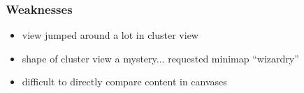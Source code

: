 \documentclass[12pt,fleqn]{ucithesis}
\begin{document}
\subsubsection{Weaknesses}

\begin{itemize}
	\item view jumped around a lot in cluster view
	\item shape of cluster view a mystery... requested minimap ``wizardry''
	\item difficult to directly compare content in canvases
\end{itemize}		



\end{document}
